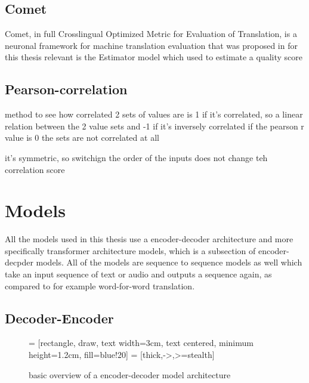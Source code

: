 \subsection{Comet}
Comet, in full Crosslingual Optimized Metric for Evaluation of Translation, is a neuronal framework for machine translation evaluation that was proposed in \cite{rei-etal-2020-comet} 
for this thesis relevant is the Estimator model which used to estimate a quality score 

\subsection{Pearson-correlation}
method to see how correlated 2 sets of values are
is 1 if it's correlated, so a linear relation between the 2 value sets and -1 if it's inversely correlated 
if the pearson r value is 0 the sets are not correlated at all

it's symmetric, so switchign the order of the inputs does not change teh correlation score

\section{Models}
\label{ch:models}
All the models used in this thesis use a encoder-decoder architecture and more specifically transformer architecture models, which is a subsection of encoder-decpder models. All of the models are sequence to sequence models as well which take an input sequence of text or audio and outputs a sequence again, as compared to for example word-for-word translation. 
\subsection{Decoder-Encoder}

\begin{figure}
    \centering
     = [rectangle, draw, text width=3cm, text centered, minimum height=1.2cm, fill=blue!20]
 = [thick,->,>=stealth]

\caption{basic overview of a encoder-decoder model architecture}
\label{fig:encoderdecodermodel}
\end{figure}

